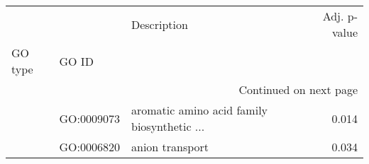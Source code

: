 \begin{longtable}{lllr}
\toprule
   &            &                                  Description &  Adj. p-value \\
GO type & GO ID &                                              &               \\
\midrule
\endhead
\midrule
\multicolumn{4}{r}{{Continued on next page}} \\
\midrule
\endfoot

\bottomrule
\endlastfoot
\multirow{2}{*}{BP} & GO:0009073 &  aromatic amino acid family biosynthetic ... &         0.014 \\
   & GO:0006820 &                              anion transport &         0.034 \\
\end{longtable}
